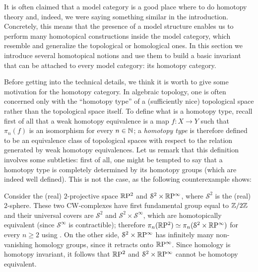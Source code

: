 \begin{refsection}
It is often claimed that a model category is a good place where to do homotopy theory and, indeed, we were saying something similar in the introduction. Concretely, this means that the presence of a model structure enables us to perform many homotopical constructions inside the model category, which resemble and generalize the topological or homological ones. In this section we introduce several homotopical notions and use them to build a basic invariant that can be attached to every model category: its homotopy category.

Before getting into the technical details, we think it is worth to give some motivation for the homotopy category. In algebraic topology, one is often concerned only with the ``homotopy type'' of a (sufficiently nice) topological space rather than the topological space itself. To define what is a homotopy type, recall first of all that a weak homotopy equivalence is a map $f \colon X \to Y$ such that $\pi_n(f)$ is an isomorphism for every $n \in \mathbb{N}$; a \emph{homotopy type} is therefore defined to be an equivalence class of topological spaces with respect to the relation generated by weak homotopy equivalences. Let us remark that this definition involves some subtleties: first of all, one might be tempted to say that a homotopy type is completely determined by its homotopy groups (which are indeed well defined). This is not the case, as the following counterexample shows:

\begin{eg}
Consider the (real) $2$-projective space $\mathbb{R} \mathrm{P}^2$ and  $\mathcal{S}^2 \times \mathbb{R} \mathrm{P}^\infty$, where $\mathcal{S}^2$ is the (real) $2$-sphere. These two CW-complexes have first fundamental group equal to $\mathbb{Z} / 2 \mathbb{Z}$ and their universal covers are $\mathcal{S}^2$ and $\mathcal{S}^2 \times \mathcal{S}^\infty$, which are homotopically equivalent (since $\mathcal{S}^\infty$ is contractible); therefore $\pi_n(\mathbb{R} \mathrm{P}^2) \simeq \pi_n(\mathcal{S}^2 \times \mathbb{R} \mathrm{P}^\infty)$ for every $n \ge 2$ using \cite[Proposition 4.1]{hatcher}. On the other side, $\mathcal{S}^2 \times \mathbb{R} \mathrm{P}^\infty$ has infinitely many non-vanishing homology groups, since it retracts onto $\mathbb{R} \mathrm{P}^\infty$. Since homology is homotopy invariant, it follows that $\mathbb{R} \mathrm{P}^2$ and $\mathcal{S}^2 \times \mathbb{R} \mathrm{P}^\infty$ cannot be homotopy equivalent.
\end{eg}


\end{refsection}
